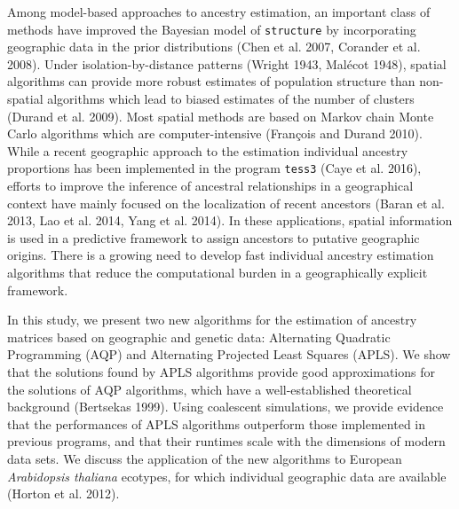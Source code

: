   Among model-based approaches to ancestry estimation, an important class of methods have improved the Bayesian model of {\tt structure} by incorporating geographic data in the prior distributions  (Chen et al. 2007, Corander et al. 2008). Under isolation-by-distance patterns (Wright 1943, Mal\'ecot 1948), spatial algorithms can provide more robust estimates of population structure than non-spatial algorithms which lead to biased estimates of the number of clusters (Durand et al. 2009).  Most spatial methods are based on Markov chain Monte Carlo algorithms which are computer-intensive (Fran\c cois and Durand 2010). While a recent geographic approach to the estimation individual ancestry proportions has been implemented in the program {\tt tess3}  (Caye et al. 2016),  efforts to improve the inference of ancestral relationships in a geographical context have mainly focused on the localization of recent ancestors (Baran et al. 2013, Lao et al. 2014, Yang et al. 2014). In these applications, spatial information is used in a predictive framework to assign ancestors to putative geographic origins. There is a growing need to develop fast individual ancestry estimation algorithms that reduce the computational burden in a geographically explicit framework. 

In this study, we present two new algorithms for the estimation of ancestry matrices based on geographic and genetic data: Alternating Quadratic Programming  (AQP) and Alternating Projected Least Squares (APLS). We show that the solutions found by APLS algorithms provide good approximations for the solutions of AQP algorithms, which have a well-established theoretical background (Bertsekas 1999). Using coalescent simulations, we provide evidence that the performances of APLS algorithms outperform those implemented in previous programs, and that their runtimes scale with the dimensions of modern data sets. We discuss the application of the new algorithms to European {\it Arabidopsis thaliana} ecotypes, for which individual geographic data are available (Horton et al. 2012). 



